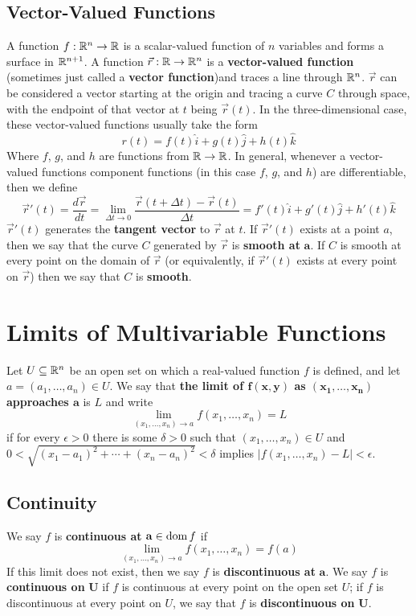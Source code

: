 \subsection{Vector-Valued Functions}

A function $f: \mathbb{R}^n \to \mathbb{R}$ is a scalar-valued function of $n$ variables and forms a surface in $\mathbb{R}^{n+1}$. A function $\vec{r}: \mathbb{R} \to \mathbb{R}^n$ is a \textbf{vector-valued function} (sometimes just called a \textbf{vector function})and traces a line through $\mathbb{R}^n$. $\vec{r}$ can be considered a vector starting at the origin and tracing a curve $C$ through space, with the endpoint of that vector at $t$ being $\vec{r}(t)$. In the three-dimensional case, these vector-valued functions usually take the form $$r(t) = f(t)\hat{i} + g(t)\hat{j} + h(t)\hat{k} $$ Where $f$, $g$, and $h$ are functions from $\mathbb{R} \to \mathbb{R}$. In general, whenever a vector-valued functions component functions (in this case $f$, $g$, and $h$) are differentiable, then we define $$\vec{r}'(t) = \frac{d\vec{r}}{dt} = \lim_{\Delta t \to 0} \frac{\vec{r}(t + \Delta t) - \vec{r}(t)}{\Delta t} = f'(t)\hat{i} + g'(t)\hat{j} + h'(t)\hat{k}$$ $\vec{r}'(t)$ generates the \textbf{tangent vector} to $\vec{r}$ at $t$. If $\vec{r}'(t)$ exists at a point $a$, then we say that the curve $C$ generated by $\vec{r}$ is \textbf{smooth at} $\mathbf{a}$. If $C$ is smooth at every point on the domain of $\vec{r}$ (or equivalently, if $\vec{r}'(t)$ exists at every point on $\vec{r}$) then we say that $C$ is \textbf{smooth}.

\section{Limits of Multivariable Functions}

Let $U \subseteq \mathbb{R}^n$ be an open set on which a real-valued function $f$ is defined, and let $a = (a_1, \ldots, a_n) \in U$. We say that \textbf{the limit of $\mathbf{f(x,y)}$ as $\mathbf{(x_1,\ldots, x_n)}$ approaches $\mathbf{a}$} is $L$ and write $$\lim_{(x_1,\ldots, x_n) \to a} f(x_1,\ldots, x_n) = L$$ if for every $\epsilon > 0$ there is some $\delta > 0$ such that $(x_1,\ldots, x_n) \in U$ and $0 < \sqrt{(x_1-a_1)^2 + \cdots + (x_n-a_n)^2} < \delta$ implies $|f(x_1, \ldots, x_n)-L| < \epsilon$.

\subsection{Continuity}

We say $f$ is \textbf{continuous at} $\mathbf{a} \in \operatorname{dom}{f}$ if $$\lim_{(x_1, \ldots, x_n)\to a} f(x_1, \ldots, x_n)=f(a)$$ If this limit does not exist, then we say $f$ is \textbf{discontinuous at} $\mathbf{a}$. We say $f$ is \textbf{continuous on} $\mathbf{U}$ if $f$ is continuous at every point on the open set $U$; if $f$ is discontinuous at every point on $U$, we say that $f$ is \textbf{discontinuous on} $\mathbf{U}$.

